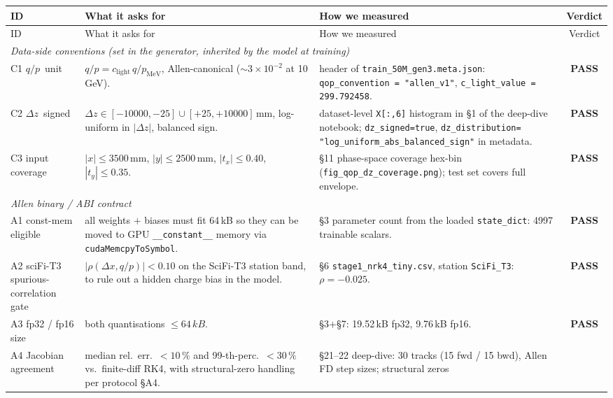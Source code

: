 \documentclass[11pt,a4paper]{article}
\newcommand{\dz}{\ensuremath{\Delta z}}
\newcommand{\qop}{\ensuremath{q/p}}
\newcommand{\PASS}{\textcolor{green!55!black}{\textbf{PASS}}}
\begin{document}
\begin{longtable}{p{} p{} p{} c}
\toprule
ID & What it asks for & How we measured & Verdict \\
\midrule
\endfirsthead
\toprule
ID & What it asks for & How we measured & Verdict \\
\midrule
\endhead
\multicolumn{4}{l}{\emph{Data-side conventions (set in the generator,
       inherited by the model at training)}}\\
C1 \qop\ unit & \(\qop = c_\text{light}\,q/p_\text{MeV}\), Allen-canonical
       (\(\sim 3{\times}10^{-2}\) at 10\,GeV). & header of
       \texttt{train\_50M\_gen3.meta.json}: \texttt{qop\_convention =
       "allen\_v1"}, \texttt{c\_light\_value = 299.792458}. & \PASS \\[3pt]
C2 \dz\ signed & \(\dz \in [-10000,-25]\cup[+25,+10000]\)\,mm,
       log-uniform in \(|\dz|\), balanced sign. & dataset-level
       \texttt{X[:,6]} histogram in §1 of the deep-dive notebook;
       \texttt{dz\_signed=true}, \texttt{dz\_distribution=
       "log\_uniform\_abs\_balanced\_sign"} in metadata. & \PASS \\[3pt]
C3 input coverage & \(|x|\le3500\)\,mm, \(|y|\le2500\)\,mm,
       \(|t_x|\le0.40\), \(|t_y|\le0.35\). & §11 phase-space coverage
       hex-bin (\texttt{fig\_qop\_dz\_coverage.png}); test set covers
       full envelope. & \PASS \\
\midrule
\multicolumn{4}{l}{\emph{Allen binary / ABI contract}}\\
A1 const-mem eligible & all weights \(+\) biases must fit
       64\,kB so they can be moved to GPU
       \texttt{\_\_constant\_\_} memory via
       \texttt{cudaMemcpyToSymbol}. & §3 parameter count from the
       loaded \texttt{state\_dict}: 4997 trainable scalars. &
       \PASS \\[3pt]
A2 sciFi-T3 spurious-correlation gate & \(|\rho(\Delta x, \qop)|<0.10\)
       on the SciFi-T3 station band, to rule out a hidden charge bias
       in the model. & §6 \texttt{stage1\_nrk4\_tiny.csv}, station
       \texttt{SciFi\_T3}: \(\rho=-0.025\). & \PASS \\[3pt]
A3 fp32 / fp16 size & both quantisations \(\le 64\,kB\). &
       §3+§7: 19.52\,kB fp32, 9.76\,kB fp16. &
       \PASS \\[3pt]
A4 Jacobian agreement & median rel.\ err.\ \(<10\,\%\) and 99-th-perc.\
       \(<30\,\%\) vs.\ finite-diff RK4, with structural-zero handling
       per protocol §A4. & §21--22 deep-dive: 30 tracks
       (15 fwd / 15 bwd), Allen FD step sizes; structural zeros

\end{longtable}
\end{document}
